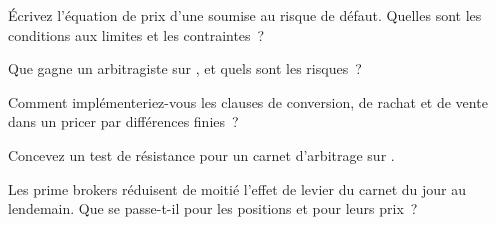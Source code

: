 \begin{interviewq}\label{iq:dv:convertibles-and-the-credit-equity-link:2}
Écrivez l'équation de prix d'une  soumise au risque de défaut. Quelles sont les conditions aux limites et les contraintes~?
\end{interviewq}

\begin{interviewq}\label{iq:dv:convertibles-and-the-credit-equity-link:3}
Que gagne un arbitragiste sur , et quels sont les risques~?
\end{interviewq}

\begin{interviewq}\label{iq:dv:convertibles-and-the-credit-equity-link:4}
Comment implémenteriez-vous les clauses de conversion, de rachat et de vente dans un pricer par différences finies~?
\end{interviewq}

\begin{interviewq}\label{iq:dv:convertibles-and-the-credit-equity-link:5}
Concevez un test de résistance pour un carnet d'arbitrage sur .
\end{interviewq}

\begin{interviewq}\label{iq:dv:convertibles-and-the-credit-equity-link:6}
Les prime brokers réduisent de moitié l'effet de levier du carnet du jour au lendemain. Que se passe-t-il pour les positions et pour leurs prix~?
\end{interviewq}
